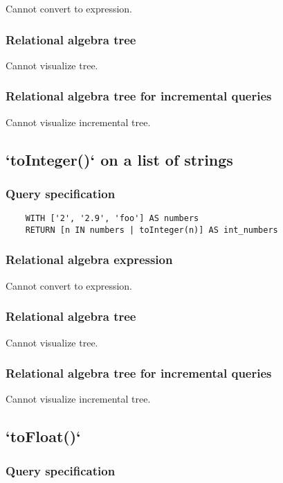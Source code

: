 	Cannot convert to expression.

	\subsubsection*{Relational algebra tree}

	Cannot visualize tree.

	\subsubsection*{Relational algebra tree for incremental queries}

	Cannot visualize incremental tree.
	\subsection{`toInteger()` on a list of strings}

	\subsubsection*{Query specification}

	\begin{lstlisting}
	WITH ['2', '2.9', 'foo'] AS numbers
	RETURN [n IN numbers | toInteger(n)] AS int_numbers
	\end{lstlisting}


	\subsubsection*{Relational algebra expression}

	Cannot convert to expression.

	\subsubsection*{Relational algebra tree}

	Cannot visualize tree.

	\subsubsection*{Relational algebra tree for incremental queries}

	Cannot visualize incremental tree.
	\subsection{`toFloat()`}

	\subsubsection*{Query specification}

